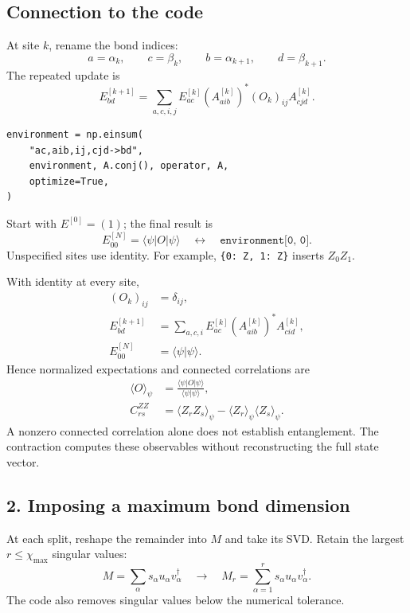 \documentclass[11pt]{article}
\newcommand{\ket}[1]{\lvert #1\rangle}
\newcommand{\bra}[1]{\langle #1\rvert}
\begin{document}
\newpage
\subsection*{Connection to the code}
At site $k$, rename the bond indices:
\begin{equation}
a=\alpha_k,\qquad c=\beta_k,\qquad b=\alpha_{k+1},\qquad d=\beta_{k+1}.
\end{equation}
The repeated update is
\begin{equation}
E^{[k+1]}_{bd}=\sum_{a,c,i,j}E^{[k]}_{ac}(A^{[k]}_{aib})^*(O_k)_{ij}A^{[k]}_{cjd}.
\end{equation}
\begin{lstlisting}
environment = np.einsum(
    "ac,aib,ij,cjd->bd",
    environment, A.conj(), operator, A,
    optimize=True,
)
\end{lstlisting}
Start with $E^{[0]}=(1)$; the final result is
\begin{equation}
E^{[N]}_{00}=\bra\psi O\ket\psi
\quad\longleftrightarrow\quad\texttt{environment[0, 0]}.
\end{equation}
Unspecified sites use identity. For example, \texttt{\{0: Z, 1: Z\}} inserts $Z_0Z_1$.

With identity at every site,
\begin{align}
(O_k)_{ij}&=\delta_{ij},\\
E^{[k+1]}_{bd}&=\sum_{a,c,i}E^{[k]}_{ac}(A^{[k]}_{aib})^*A^{[k]}_{cid},\\
E^{[N]}_{00}&=\langle\psi|\psi\rangle.
\end{align}
Hence normalized expectations and connected correlations are
\begin{align}
\langle O\rangle_\psi&=\frac{\bra\psi O\ket\psi}{\langle\psi|\psi\rangle},\\
C^{ZZ}_{rs}&=\langle Z_rZ_s\rangle_\psi-\langle Z_r\rangle_\psi\langle Z_s\rangle_\psi.
\end{align}
A nonzero connected correlation alone does not establish entanglement. The contraction computes these observables without reconstructing the full state vector.

\subsection*{2. Imposing a maximum bond dimension}
At each split, reshape the remainder into $M$ and take its SVD. Retain the largest $r\leq\chi_{\max}$ singular values:
\begin{equation}
M=\sum_\alpha s_\alpha u_\alpha v_\alpha^\dagger
\quad\longrightarrow\quad
M_r=\sum_{\alpha=1}^{r}s_\alpha u_\alpha v_\alpha^\dagger.
\end{equation}
The code also removes singular values below the numerical tolerance.
\end{document}
